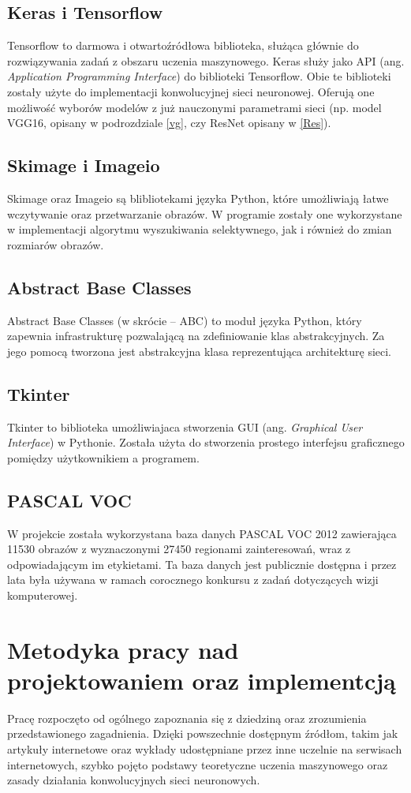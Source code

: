 \documentclass[a4paper,twoside,12pt]{book}
\newcommand{\obcy}[1]{\emph{#1}}
\newcommand{\ang}[1]{{\selectlanguage{british}\obcy{#1}}}
\begin{document}
{\subsection{Keras i Tensorflow}
{Tensorflow to darmowa i otwartoźródłowa biblioteka, służąca głównie do rozwiązywania zadań z obszaru uczenia maszynowego. Keras służy jako API (ang. \ang{Application Programming Interface}) do biblioteki Tensorflow. Obie te biblioteki zostały użyte do implementacji konwolucyjnej sieci neuronowej. Oferują one możliwość wyborów modelów z już nauczonymi parametrami sieci (np. model VGG16, opisany w podrozdziale \ref{vg}, czy ResNet opisany w \ref{Res}).}
\subsection{Skimage i Imageio}
{Skimage oraz Imageio są blibliotekami języka Python, które umożliwiają łatwe wczytywanie oraz przetwarzanie obrazów. W programie zostały one wykorzystane w implementacji algorytmu wyszukiwania selektywnego, jak i również do zmian rozmiarów obrazów.}
\subsection{Abstract Base Classes}
\label{abc}
{Abstract Base Classes (w skrócie – ABC) to moduł języka Python, który zapewnia infrastrukturę pozwalającą na zdefiniowanie klas abstrakcyjnych. Za jego pomocą tworzona jest abstrakcyjna klasa reprezentująca architekturę sieci. }
\subsection{Tkinter}
{Tkinter to biblioteka umożliwiajaca stworzenia GUI (ang. \ang{Graphical User Interface}) w Pythonie. Została użyta do stworzenia prostego interfejsu graficznego pomiędzy użytkownikiem a programem.}
\subsection{PASCAL VOC}
{W projekcie została wykorzystana baza danych PASCAL VOC 2012\cite{PASCAL} zawierająca 11530 obrazów z wyznaczonymi 27450 regionami zainteresowań, wraz z odpowiadającym im etykietami. Ta baza danych jest publicznie dostępna i przez lata była używana w ramach corocznego konkursu z zadań dotyczących wizji komputerowej.
}

\section{Metodyka pracy nad projektowaniem oraz implementcją}
{Pracę rozpoczęto od ogólnego zapoznania się z dziedziną oraz zrozumienia przedstawionego zagadnienia. Dzięki powszechnie dostępnym źródłom, takim jak artykuły internetowe oraz wykłady udostępniane przez inne uczelnie na serwisach internetowych, szybko pojęto podstawy teoretyczne uczenia maszynowego oraz zasady działania konwolucyjnych sieci neuronowych.}

}
\end{document}
